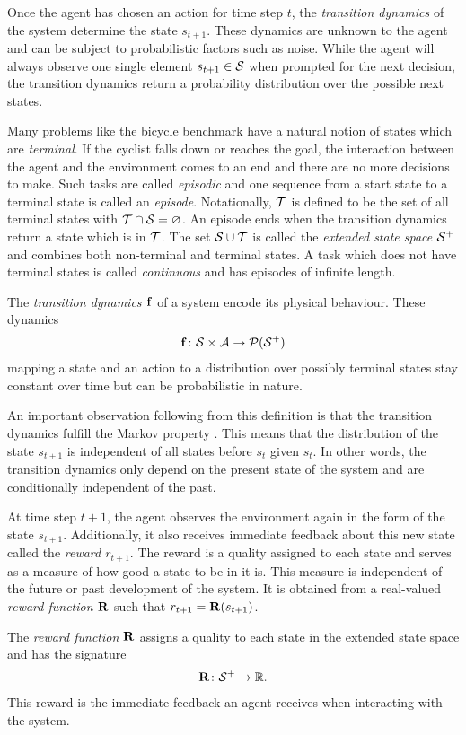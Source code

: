 Once the agent has chosen an action for time step $t$, the \emph{transition dynamics} of the system determine the state $s_{t+1}$.
These dynamics are unknown to the agent and can be subject to probabilistic factors such as noise.
While the agent will always observe one single element $s_{t+1} \in \mathcal{S}$ when prompted for the next decision, the transition dynamics return a probability distribution over the possible next states.

Many problems like the bicycle benchmark have a natural notion of states which are \emph{terminal}.
If the cyclist falls down or reaches the goal, the interaction between the agent and the environment comes to an end and there are no more decisions to make.
Such tasks are called \emph{episodic} and one sequence from a start state to a terminal state is called an \emph{episode}.
Notationally, $\mathcal{T}$ is defined to be the set of all terminal states with $\mathcal{T} \cap \mathcal{S} = \varnothing$.
An episode ends when the transition dynamics return a state which is in $\mathcal{T}$.
The set $\mathcal{S} \cup \mathcal{T}$ is called the \emph{extended state space $\mathcal{S}^+$} and combines both non-terminal and terminal states.
A task which does not have terminal states is called \emph{continuous} and has episodes of infinite length.

\begin{definition}
    \label{def:transition_dynamics}
    The \emph{transition dynamics $\operatorname{\mathbf{f}}$} of a system encode its physical behaviour.
    These dynamics
    \begin{align}
        \operatorname{\mathbf{f}} \colon \mathcal{S} \times \mathcal{A} \to \operatorname{\mathcal{P}}(\mathcal{S}^+)
    \end{align}
    mapping a state and an action to a distribution over possibly terminal states stay constant over time but can be probabilistic in nature.
\end{definition}
An important observation following from this definition is that the transition dynamics fulfill the Markov property \cite{sutton_reinforcement_1998}.
This means that the distribution of the state $s_{t+1}$ is independent of all states before $s_t$ given $s_t$.
In other words, the transition dynamics only depend on the present state of the system and are conditionally independent of the past.

At time step $t+1$, the agent observes the environment again in the form of the state $s_{t+1}$.
Additionally, it also receives immediate feedback about this new state called the \emph{reward $r_{t+1}$}.
The reward is a quality assigned to each state and serves as a measure of how good a state to be in it is.
This measure is independent of the future or past development of the system.
It is obtained from a real-valued \emph{reward function $\operatorname{\mathbf{R}}$} such that $r_{t+1} = \operatorname{\mathbf{R}}(s_{t+1})$.
\begin{definition}
    \label{def:reward_function}
    The \emph{reward function $\operatorname{\mathbf{R}}$} assigns a quality to each state in the extended state space and has the signature
    \begin{align}
        \operatorname{\mathbf{R}} \colon \mathcal{S}^+ \to \mathbb{R}.
    \end{align}
    This reward is the immediate feedback an agent receives when interacting with the system.
\end{definition}

